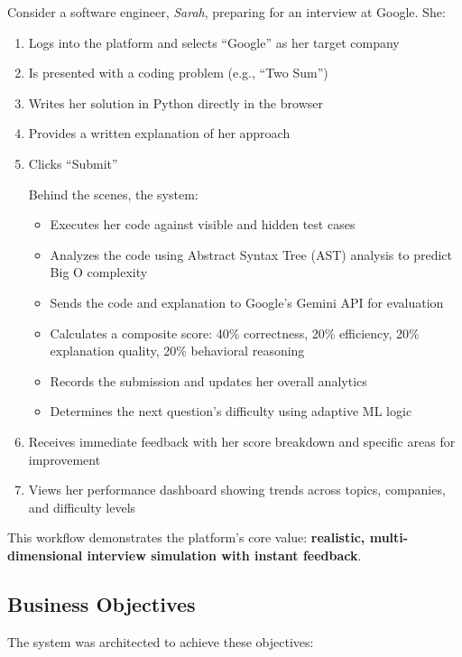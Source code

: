 \documentclass[12pt,a4paper,oneside]{article}
\begin{document}
Consider a software engineer, \textit{Sarah}, preparing for an interview at Google. She:

\begin{enumerate}
    \item Logs into the platform and selects ``Google'' as her target company
    \item Is presented with a coding problem (e.g., ``Two Sum'')
    \item Writes her solution in Python directly in the browser
    \item Provides a written explanation of her approach
    \item Clicks ``Submit''
    
    Behind the scenes, the system:
    \begin{itemize}
        \item Executes her code against visible and hidden test cases
        \item Analyzes the code using Abstract Syntax Tree (AST) analysis to predict Big O complexity
        \item Sends the code and explanation to Google's Gemini API for evaluation
        \item Calculates a composite score: 40\% correctness, 20\% efficiency, 20\% explanation quality, 20\% behavioral reasoning
        \item Records the submission and updates her overall analytics
        \item Determines the next question's difficulty using adaptive ML logic
    \end{itemize}
    
    \item Receives immediate feedback with her score breakdown and specific areas for improvement
    \item Views her performance dashboard showing trends across topics, companies, and difficulty levels
\end{enumerate}

This workflow demonstrates the platform's core value: \textbf{realistic, multi-dimensional interview simulation with instant feedback}.

\subsection{Business Objectives}

The system was architected to achieve these objectives:
\end{document}
